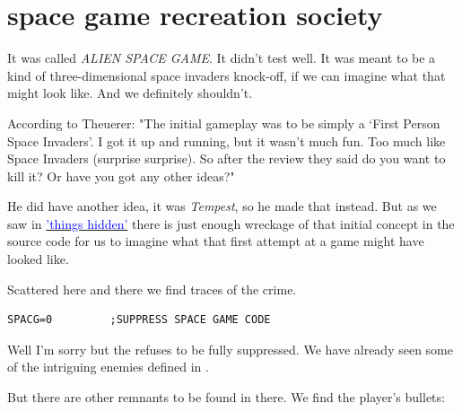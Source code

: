 \chapter{space game recreation society}
\label{sec:recreation}
\lhead[tempest]{}
\lstset{style=6502Style}

It was called \textit{ALIEN SPACE GAME}. It didn't test well. It was meant to be a kind of
three-dimensional space invaders knock-off, if we can imagine what that might look like. And we definitely shouldn't.

According to Theuerer: "The initial gameplay was to be simply a ‘First Person Space Invaders’. I got it up and running, but it wasn’t much fun. Too much like Space Invaders (surprise surprise). So after the review they said do you want to kill it? Or have you got any other ideas?"

He did have another idea, it was \textit{Tempest}, so he made that instead. But as we saw in 
\hyperref[sec:things_hidden]{\textcolor{blue}{'things hidden'}}
there is just enough wreckage of that initial concept in the source code for us to imagine what
that first attempt at a game might have looked like.

Scattered here and there we find traces of the crime.

\begin{lstlisting}
SPACG=0			;SUPPRESS SPACE GAME CODE
\end{lstlisting}

Well I'm sorry but the  refuses to be fully suppressed. We have already seen some of the intriguing
enemies defined in . 

But there are other remnants to be found in there. We find the player's bullets:

